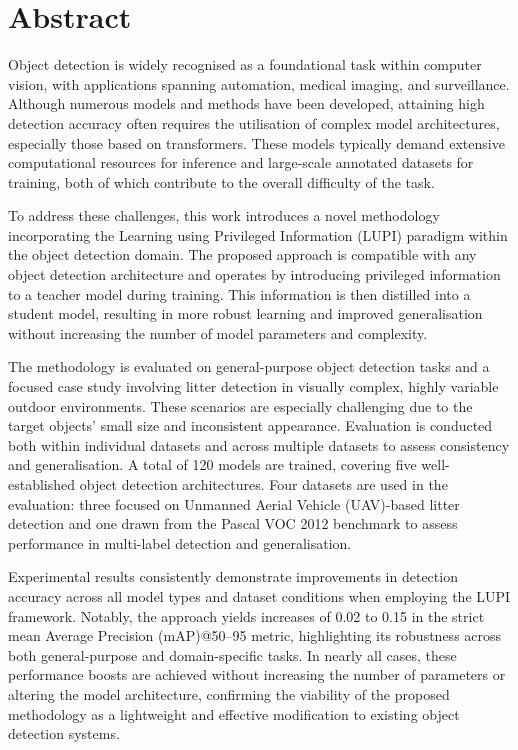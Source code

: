 \chapter*{Abstract}

Object detection is widely recognised as a foundational task within computer vision, with applications spanning automation, medical imaging, and surveillance. Although numerous models and methods have been developed, attaining high detection accuracy often requires the utilisation of complex model architectures, especially those based on transformers. These models typically demand extensive computational resources for inference and large-scale annotated datasets for training, both of which contribute to the overall difficulty of the task.

To address these challenges, this work introduces a novel methodology incorporating the Learning using Privileged Information (LUPI) paradigm within the object detection domain. The proposed approach is compatible with any object detection architecture and operates by introducing privileged information to a teacher model during training. This information is then distilled into a student model, resulting in more robust learning and improved generalisation without increasing the number of model parameters and complexity.

The methodology is evaluated on general-purpose object detection tasks and a focused case study involving litter detection in visually complex, highly variable outdoor environments. These scenarios are especially challenging due to the target objects' small size and inconsistent appearance. Evaluation is conducted both within individual datasets and across multiple datasets to assess consistency and generalisation. A total of 120 models are trained, covering five well-established object detection architectures. Four datasets are used in the evaluation: three focused on Unmanned Aerial Vehicle (UAV)-based litter detection and one drawn from the Pascal VOC 2012 benchmark to assess performance in multi-label detection and generalisation.

Experimental results consistently demonstrate improvements in detection accuracy across all model types and dataset conditions when employing the LUPI framework. Notably, the approach yields increases of 0.02 to 0.15 in the strict mean Average Precision (mAP)@50--95 metric, highlighting its robustness across both general-purpose and domain-specific tasks. In nearly all cases, these performance boosts are achieved without increasing the number of parameters or altering the model architecture, confirming the viability of the proposed methodology as a lightweight and effective modification to existing object detection systems.


